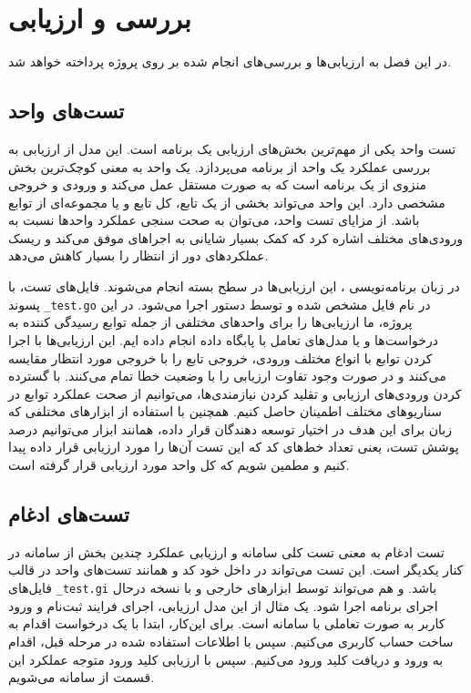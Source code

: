 \chapter{بررسی و ارزیابی}
در این فصل به ارزیابی‌ها و بررسی‌های انجام شده بر روی پروژه پرداخته خواهد شد.

\section{تست‌های واحد}
تست واحد یکی از مهم‌ترین بخش‌های ارزیابی یک برنامه است. این مدل از ارزیابی به بررسی عملکرد یک واحد از برنامه می‌پردازد. یک واحد به معنی کوچک‌ترین بخش منزوی از یک برنامه ‌است که به صورت مستقل عمل می‌کند و ورودی و خروجی مشخصی دارد. این واحد می‌تواند بخشی از یک تابع، کل تابع و یا مجموعه‌ای از توابع باشد. از مزایای تست واحد، می‌توان به صحت سنجی عملکرد واحد‌ها نسبت به ورودی‌های مختلف اشاره کرد که کمک بسیار شایانی به اجرا‌های موفق می‌کند و ریسک عملکردهای دور از انتظار را بسیار کاهش می‌دهد. 

در زبان برنامه‌نویسی ، این ارزیابی‌ها در سطح بسته انجام می‌شوند. فایل‌های تست، با پسوند \texttt{\_test.go} در نام فایل مشخص شده و توسط دستور  اجرا می‌شود. در این پروژه، ما ارزیابی‌ها را برای واحدهای مختلفی از جمله توابع رسیدگی کننده به درخواست‌ها و یا مدل‌های تعامل با پابگاه داده انجام داده ایم. این ارزیابی‌ها با اجرا کردن توابع با انواع مختلف ورودی، خروجی تابع را با خروجی مورد انتظار مقایسه می‌کنند و در صورت وجود تفاوت ارزیابی را با وضعیت خطا تمام می‌کنند. با گسترده کردن ورودی‌های ارزیابی و تقلید کردن نیازمندی‌ها، می‌توانیم از صحت عملکرد توابع در سناریو‌های مختلف اطمینان حاصل کنیم. همچنین با استفاده از ابزار‌های مختلفی که زبان  برای این هدف در اختیار توسعه دهندگان قرار داده، همانند ابزار  می‌توانیم درصد پوشش تست، یعنی تعداد خط‌های کد که این تست آن‌ها را مورد ارزیابی قرار داده پیدا کنیم و مطمین شویم که کل واحد مورد ارزیابی قرار گرفته است.


\section{تست‌های ادغام}
تست ادغام به معنی تست کلی سامانه و ارزیابی عملکرد چندین بخش از سامانه در کنار یکدیگر است. این تست می‌تواند در داخل خود کد و همانند تست‌های واحد در قالب فایل‌های \texttt{\_test.gi} باشد. و هم می‌تواند توسط ابزار‌های خارجی و با نسخه درحال اجرای برنامه اجرا شود. یک مثال از این مدل ارزیابی، اجرای فرایند ثبت‌نام و ورود کاربر به صورت تعاملی با سامانه است. برای این‌کار، ابتدا با یک درخواست اقدام به ساخت حساب کاربری می‌کنیم. سپس با اطلاعات استفاده شده در مرحله قبل، اقدام به ورود و دریافت کلید ورود می‌کنیم. سپس با ارزیابی کلید ورود متوجه عملکرد این قسمت از سامانه می‌شویم.

